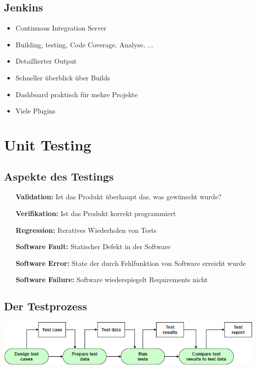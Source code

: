 \documentclass[a4paper,10pt]{article}
\newcommand{\Bold}[1]{\textbf{#1}} %
\begin{document}
\subsection{Jenkins}
\begin{itemize}
 \item Continuous Integration Server
 \item Building, testing, Code Coverage, Analyse, ...
 \item Detaillierter Output
 \item Schneller \"uberblick \"uber Builds
 \item Dashboard praktisch f\"ur mehre Projekte
 \item Viele Plugins
\end{itemize}

\pagebreak
\section{Unit Testing}

\subsection{Aspekte des Testings}
\begin{itemize}
 \item[\Bold {Validation:}] 		Ist das Produkt \"uberhaupt das, was gew\"unscht wurde? 
 \item[\Bold {Verifikation:}]		Ist das Produkt korrekt programmiert
 \item[\Bold {Regression:}]	Iteratives Wiederholen von Tests 
 \item[\Bold {Software Fault:}]	Statischer Defekt in der Software
 \item[\Bold {Software Error:}]	State der durch Fehlfunktion von Software erreicht wurde
 \item[\Bold {Software Failure:}] 	Software wiederspiegelt Requirements nicht
\end{itemize}

\subsection{Der Testprozess}
\includegraphics[scale=0.75]{unit_test.png}
\end{document}
